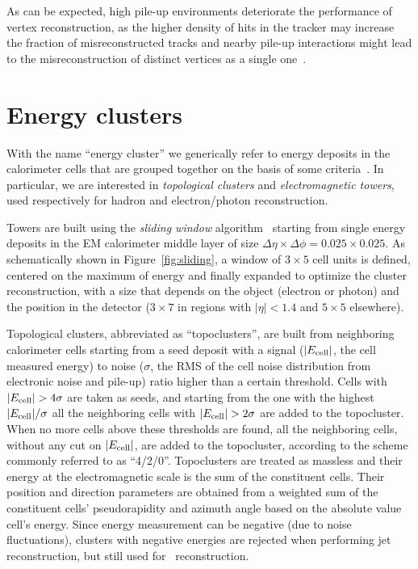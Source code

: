 As can be expected, high pile-up environments deteriorate the performance of vertex reconstruction,
as the higher density of hits in the tracker may increase
the fraction of misreconstructed tracks and nearby 
pile-up interactions might lead to the misreconstruction
of distinct vertices as a single one~\cite{ATLAS-CONF-2012-042}.



\section{Energy clusters}\label{sec:clusters}

With the name ``energy cluster'' we generically refer to energy deposits in the calorimeter
cells that are grouped together on the basis of some criteria~\cite{topocluster}.
In particular, we are interested in {\it topological clusters} and {\it electromagnetic towers},
used respectively for hadron and electron/photon reconstruction.

Towers are built using the {\it sliding window} algorithm~\cite{eperf} starting from
single energy deposits in the EM calorimeter middle layer of size
$\Delta\eta\times\Delta\phi=0.025\times0.025$. As schematically shown in Figure~\ref{fig:sliding},
a window of  $3\times5$ cell units is defined, centered on the maximum of
energy and finally expanded to optimize the cluster reconstruction, with a size
that depends on the object (electron or photon) and the position in the detector
($3\times7$ in regions with $|\eta|<1.4$ and $5\times5$ elsewhere).

Topological clusters, abbreviated as ``topoclusters'', are 
built from neighboring calorimeter cells starting from a seed deposit with a signal 
($|E_{\rm cell}|$, the cell measured energy) to noise 
($\sigma$, the RMS of the cell noise distribution from electronic noise
and pile-up) ratio
higher than a certain threshold. Cells with $|E_{\rm cell}|>4\sigma$ 
are taken as seeds, and starting from the
one with the highest $|E_{\rm cell}|/\sigma$ all the neighboring 
cells with $|E_{\rm cell}| > 2\sigma$ are added to the topocluster.
When no more cells above these thresholds are found, all the neighboring
cells, without any cut on $|E_{\rm cell}|$, are added to the topocluster,
according to the scheme commonly referred to as ``4/2/0''.
Topoclusters are treated as massless and their energy at the electromagnetic 
scale is the sum of the constituent cells. Their position and direction parameters
are obtained from a weighted sum of the constituent cells' pseudorapidity and azimuth angle
based on the absolute value cell's energy. Since energy measurement can be negative (due to
noise fluctuations), clusters with negative energies are rejected
when performing jet reconstruction, but still used for \met\ reconstruction.

